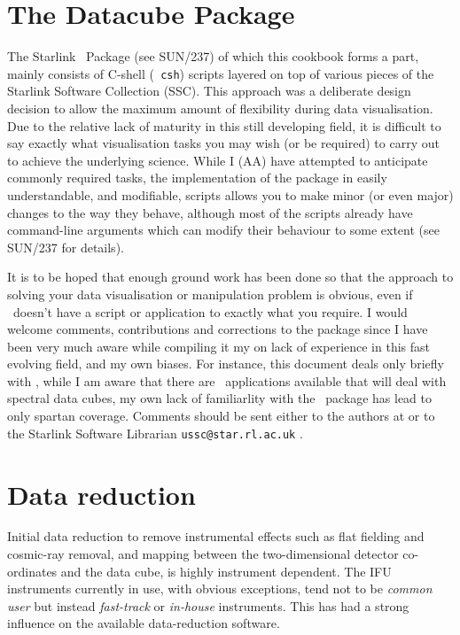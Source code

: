 \documentclass[twoside,11pt]{article}
\newcommand{\htmladdnormallink}[2]{#1}
\newenvironment{latexonly}{}{}
\newcommand{\xref}[3]{#1}
\newcommand{\xlabel}[1]{}
\newcommand{\latex}[1]{#1}
\begin{document}
\section{\xlabel{sc16_datacubepackage}The Datacube Package\label{sc16_datacubepackage}}

The \htmladdnormallink{Starlink}{http://www.starlink.ac.uk/} 
\DATACUBEref\ Package 
\begin{latexonly}
(see SUN/237)
\end{latexonly}
of which this cookbook forms a part, mainly consists of C-shell ({\tt
csh}) scripts layered on top of various pieces of the Starlink
Software Collection (SSC).  This approach was a deliberate design
decision to allow the maximum amount of flexibility during data
visualisation.  Due to the relative lack of maturity in this still
developing field, it is difficult to say exactly what visualisation
tasks you may wish (or be required) to carry out to achieve the
underlying science.  While I (AA) have attempted to anticipate commonly
required tasks, the implementation of the package in easily
understandable, and modifiable, scripts allows you to make minor (or
even major) changes to the way they behave, although most of the
scripts already have \xref{command-line arguments}{sun237}{} which
can modify their behaviour to some extent\latex{ (see SUN/237 for
details)}.

It is to be hoped that enough ground work has been done so that the
approach to solving your data visualisation or manipulation problem is
obvious, even if \DATACUBE\ doesn't have a script or application to
exactly what you require.  I would welcome comments, contributions and
corrections to the package since I have been very much aware while
compiling it my on lack of experience in this fast evolving field, and
my own biases.  For instance, this document deals only briefly with
\IRAFref, while I am aware that there are \IRAF\ applications
available that will deal with spectral data cubes, my own lack of
familiarlity with the \IRAF\ package has lead to only spartan
coverage.  Comments should be sent either to the authors at or to
the Starlink Software Librarian
\htmladdnormallink{{\tt ussc@star.rl.ac.uk} }{mailto:ussc@star.rl.ac.uk}.

\section{\xlabel{sc16_reduction}Data reduction\label{sc16_reduction}}

Initial data reduction to remove instrumental effects such as flat
fielding and cosmic-ray removal, and mapping between the
two-dimensional detector co-ordinates and the data cube, is highly
instrument dependent.  The IFU instruments currently in use, with
obvious exceptions, tend not to be {\em common user} but instead {\em
fast-track} or {\em in-house} instruments.  This has had a strong
influence on the available data-reduction software.
\end{document}
